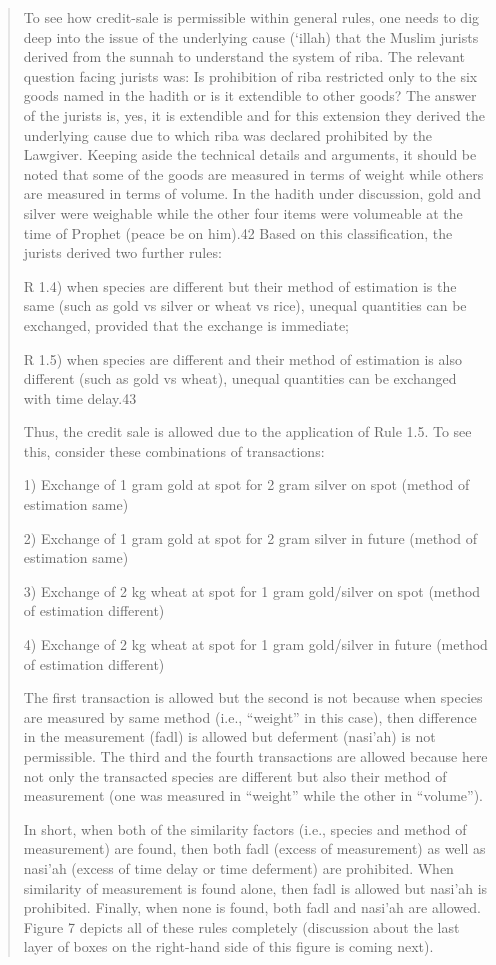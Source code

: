 \begin{quote}
To see how credit-sale is permissible within general rules, one needs to dig deep into the issue of the underlying cause (‘illah) that the Muslim jurists derived from the sunnah to understand the system of riba. The relevant question facing jurists was: Is prohibition of riba restricted only to the six goods named in the hadith or is it extendible to other goods? The answer of the jurists is, yes, it is extendible and for this extension they derived the underlying cause due to which riba was declared prohibited by the Lawgiver. Keeping aside the technical details and arguments, it should be noted that some of the goods are measured in terms of weight while others are measured in terms of volume. In the hadith under discussion, gold and silver were weighable while the other four items were volumeable at the time of Prophet (peace be on him).42 Based on this classification, the jurists derived two further rules:

R 1.4) when species are different but their method of estimation is the same (such as gold vs silver or wheat vs rice), unequal quantities can be exchanged, provided that the exchange is immediate;

R 1.5) when species are different and their method of estimation is also different (such as gold vs wheat), unequal quantities can be exchanged with time delay.43

Thus, the credit sale is allowed due to the application of Rule 1.5. To see this, consider these combinations of transactions:

1) Exchange of 1 gram gold at spot for 2 gram silver on spot (method of estimation same)

2) Exchange of 1 gram gold at spot for 2 gram silver in future (method of estimation same)

3) Exchange of 2 kg wheat at spot for 1 gram gold/silver on spot (method of estimation different)

4) Exchange of 2 kg wheat at spot for 1 gram gold/silver in future (method of estimation different)

The first transaction is allowed but the second is not because when species are measured by same method (i.e., “weight” in this case), then difference in the measurement (fadl) is allowed but deferment (nasi'ah) is not permissible. The third and the fourth transactions are allowed because here not only the transacted species are different but also their method of measurement (one was measured in “weight” while the other in “volume”).

In short, when both of the similarity factors (i.e., species and method of measurement) are found, then both fadl (excess of measurement) as well as nasi'ah (excess of time delay or time deferment) are prohibited. When similarity of measurement is found alone, then fadl is allowed but nasi'ah is prohibited. Finally, when none is found, both fadl and nasi'ah are allowed. Figure 7 depicts all of these rules completely (discussion about the last layer of boxes on the right-hand side of this figure is coming next).


\end{quote}
